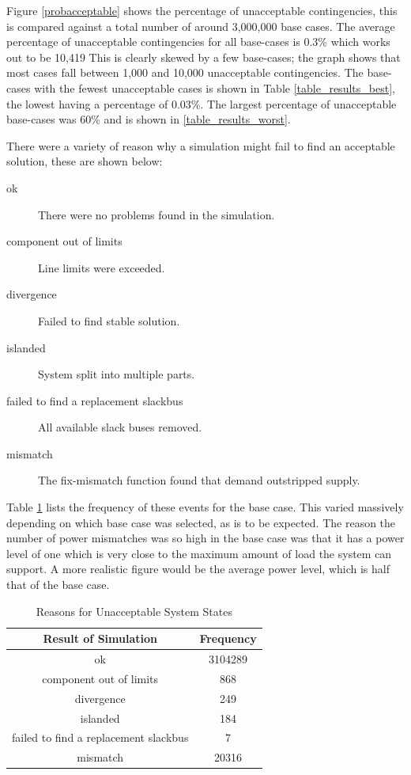 \documentclass[a4paper,oneside,12pt]{report}
\begin{document}
Figure \ref{probacceptable} shows the percentage of unacceptable contingencies, this is compared against a total number of around 3,000,000 base cases. The average percentage of unacceptable contingencies for all base-cases is 0.3\% which works out to be 10,419 This is clearly skewed by a few base-cases; the graph shows that most cases fall between 1,000 and 10,000 unacceptable contingencies. The base-cases with the fewest unacceptable cases is shown in Table \ref{table_results_best}, the lowest having a percentage of 0.03\%. The largest percentage of unacceptable base-cases was 60\% and is shown in \ref{table_results_worst}.

There were a variety of reason why a simulation might fail to find an acceptable solution, these are shown below: 

\begin{description}
\item[ok] There were no problems found in the simulation.
\item[component out of limits] Line limits were exceeded.
\item[divergence] Failed to find stable solution.
\item[islanded] System split into multiple parts.
\item[failed to find a replacement slackbus] All available slack buses removed.
\item[mismatch] The fix-mismatch function found that demand outstripped supply.
\end{description}

Table \ref{table_failure_reasons} lists the frequency of these events for the base case. This varied massively depending on which base case was selected, as is to be expected. The reason the number of power mismatches was so high in the base case was that it has a power level of one which is very close to the maximum amount of load the system can support. A more realistic figure would be the average power level, which is half that of the base case. 

\begin{table}[htbp]
\caption{Reasons for Unacceptable System States}
\label{table_failure_reasons}
\centering
\begin{tabular}{c||c}
\bfseries Result of Simulation & \bfseries Frequency \\
\hline \hline
ok & 3104289 \\ 
component out of limits & 868 \\ 
divergence & 249 \\ 
islanded & 184 \\ 
failed to find a replacement slackbus & 7 \\ 
mismatch & 20316 \\ 
\hline
\end{tabular} \\
\end{table}
\end{document}
